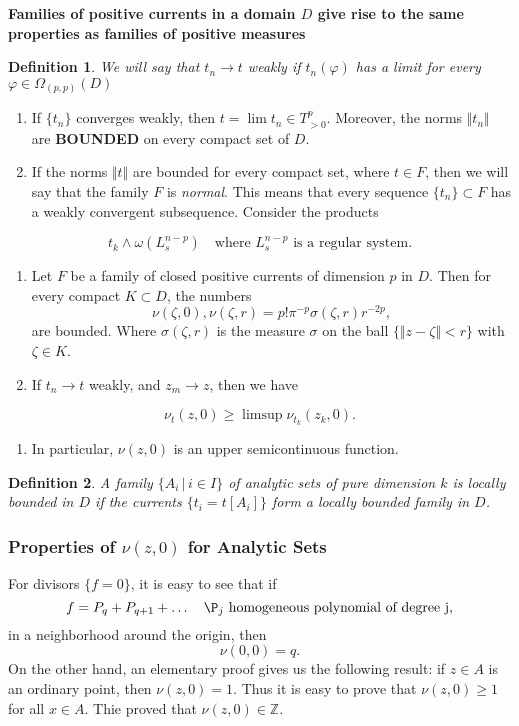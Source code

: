 \documentclass[12pt,twoside,a4paper]{report}
\newtheorem{definition}{Definition}[section]
\begin{document}
\textbf{Families of positive currents in a domain $D$ give rise to the same properties as families of positive measures}

\begin{definition}
We will say that $t_n\rightarrow t$ \emph{weakly} if $t_n(\varphi)$ has a limit for every $\varphi\in\Omega_{(p,p)}(D)$
\end{definition}

\begin{enumerate}
\item If $\{t_n\}$ converges weakly, then $t=\lim t_n\in T^p_{>0}$. Moreover, the norms $\Vert t_n\Vert$ are \textbf{BOUNDED} on every compact set of $D$.
\item If the norms $\Vert t\Vert$ are bounded for every compact set, where $t\in F$, then we will say that the family $F$ is \emph{normal}. This means that every sequence $\{t_n\}\subset F$ has a weakly convergent subsequence.
Consider the products
\end{enumerate}
\[
    t_k\wedge\omega(L^{n-p}_s)\quad\text{where }L^{n-p}_s\text{ is a regular system}.
\]
\begin{enumerate}
\item Let $F$ be a family of closed positive currents of dimension $p$ in $D$. Then for every compact $K\subset D$, the numbers
\[
        \nu(\zeta,0),\nu(\zeta,r)=p!\pi^{-p}\sigma(\zeta,r)r^{-2p},
   \]
\noindent are bounded. Where $\sigma(\zeta,r)$ is the measure $\sigma$ on the ball $\{\Vert z-\zeta\Vert<r\}$ with $\zeta\in K$.
\item If $t_n\rightarrow t$ weakly, and $z_m\rightarrow z$, then we have
\end{enumerate}
\begin{equation}
        \nu_t(z,0)\geq\limsup\nu_{t_k}(z_k,0).
\end{equation}
\begin{enumerate}
\item In particular, $\nu(z,0)$ is an upper semicontinuous function.
\end{enumerate}

\begin{definition}
A family $\{A_i\,|\,i\in I\}$ of analytic sets of pure dimension $k$ is locally bounded in $D$ if the currents $\{t_i=t[A_i]\}$ form a locally bounded family in $D$.
\end{definition}

\subsubsection{Properties of $\nu(z,0)$ for Analytic Sets}
\label{sec:org81bac70}
For divisors $\{f=0\}$, it is easy to see that if
\[
    f=P_q+P_{q+1}+\dots\quad\P_j\text{ homogeneous polynomial of degree j},
\]
\noindent in a neighborhood around the origin, then
\[
    \nu(0,0)=q.
\]
On the other hand, an elementary proof gives us the following result: if $z\in A$ is an ordinary point, then $\nu(z,0)=1$. Thus it is easy to prove that $\nu(z,0)\geq1$ for all $x\in A$. Thie proved that $\nu(z,0)\in\mathbb{Z}$.
\end{document}

